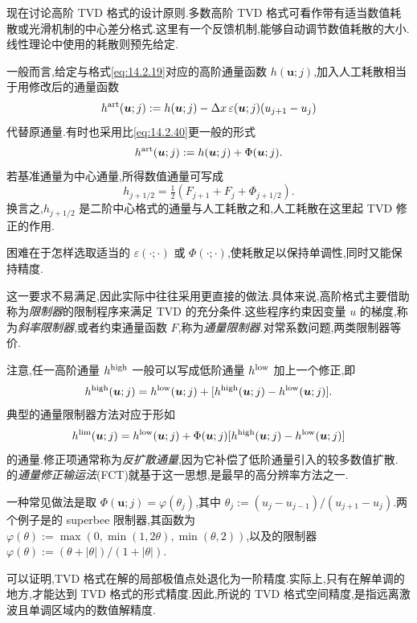 现在讨论高阶 TVD 格式的设计原则.多数高阶 TVD 格式可看作带有适当数值耗散或光滑机制的中心差分格式.这里有一个反馈机制,能够自动调节数值耗散的大小.线性理论中使用的耗散则预先给定.

一般而言,给定与格式\eqref{eq:14.2.19}对应的高阶通量函数 \(h(\boldsymbol{u};j)\),加入人工耗散相当于用修改后的通量函数
\begin{equation}\label{eq:14.2.40}
  h^{\rm art}(\boldsymbol{u};j):=h(\boldsymbol{u};j)
             -\Delta x\,\varepsilon(\boldsymbol{u};j)(u_{j+1}-u_j)
\end{equation}
代替原通量.有时也采用比\eqref{eq:14.2.40}更一般的形式
\[
  h^{\rm art}(\boldsymbol{u};j):=h(\boldsymbol{u};j)+\Phi(\boldsymbol{u};j).
\]
若基准通量为中心通量,所得数值通量可写成
\[
  h_{j+1/2}=\tfrac12(F_{j+1}+F_j+\Phi_{j+1/2}).
\]
换言之,\(h_{j+1/2}\) 是二阶中心格式的通量与人工耗散之和,人工耗散在这里起 TVD 修正的作用.

困难在于怎样选取适当的 \(\varepsilon(\cdot;\cdot)\) 或 \(\Phi(\cdot;\cdot)\),使耗散足以保持单调性,同时又能保持精度.

这一要求不易满足,因此实际中往往采用更直接的做法.具体来说,高阶格式主要借助称为\emph{限制器}的限制程序来满足 TVD 的充分条件.这些程序约束因变量 \(u\) 的梯度,称为\emph{斜率限制器},或者约束通量函数 \(F\),称为\emph{通量限制器}.对常系数问题,两类限制器等价.

注意,任一高阶通量 \(h^{\rm high}\) 一般可以写成低阶通量 \(h^{\rm low}\) 加上一个修正,即
\[
  h^{\rm high}(\boldsymbol{u};j)
    =h^{\rm low}(\boldsymbol{u};j)+[h^{\rm high}(\boldsymbol{u};j)-h^{\rm low}(\boldsymbol{u};j)].
\]
典型的通量限制器方法对应于形如
\begin{equation}\label{eq:14.2.41}
  h^{\rm lim}(\boldsymbol{u};j)=h^{\rm low}(\boldsymbol{u};j)
     +\Phi(\boldsymbol{u};j)[h^{\rm high}(\boldsymbol{u};j)-h^{\rm low}(\boldsymbol{u};j)]
\end{equation}
的通量.修正项通常称为\emph{反扩散通量},因为它补偿了低阶通量引入的较多数值扩散.
的\emph{通量修正输运法}(FCT)就基于这一思想,是最早的高分辨率方法之一.

一种常见做法是取 \(\Phi(\boldsymbol{u};j)=\varphi(\theta_j)\),其中 \(\theta_j:=(u_j-u_{j-1})/(u_{j+1}-u_j)\).两个例子是的 superbee 限制器,其函数为 \(\varphi(\theta):=\max(0,\min(1,2\theta),\min(\theta,2))\),以及的限制器 \(\varphi(\theta):=(\theta+|\theta|)/(1+|\theta|)\).

可以证明,TVD 格式在解的局部极值点处退化为一阶精度.实际上,只有在解单调的地方,才能达到 TVD 格式的形式精度.因此,所说的 TVD 格式空间精度,是指远离激波且单调区域内的数值解精度.

